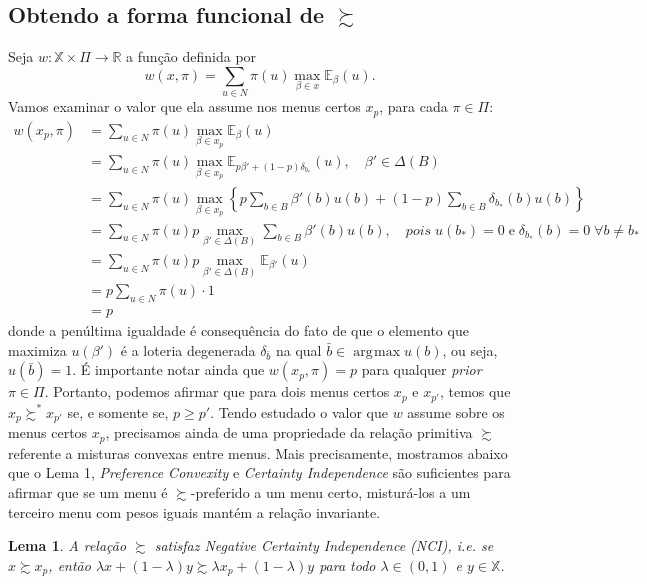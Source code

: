 \documentclass[11pt, a4paper]{article}
\theoremstyle{nonumberplain}
\theoremstyle{plain}
\theoremstyle{plain}
\theoremstyle{plain}
\newtheorem{lemma}{Lema}
\theoremstyle{nonumberplain}
\DeclareMathOperator*{\argmax}{\arg\!\max}
\begin{document}
\subsection{Obtendo a forma funcional de $\succsim$}
Seja $w:\mathbb{X}\times \Pi\rightarrow \mathbb{R}$ a função definida por $$w(x,\pi)=\sum_{u\in N} \pi(u)\max_{\beta\in x}\mathbb{E}_\beta(u).$$ Vamos examinar o valor que ela assume nos menus certos $x_p$, para cada $\pi\in\Pi$:
\begin{align*}
w(x_p,\pi)&=\sum_{u\in N} \pi(u)\max_{\beta\in x_{p}}\mathbb{E}_\beta(u)\\
&= \sum_{u\in N} \pi(u)\max_{\beta\in x_{p}}\mathbb{E}_{p\beta'+(1-p)\delta_{b_*}}(u),\quad \beta'\in \Delta(B)\\
&=\sum_{u\in N} \pi(u)\max_{\beta\in x_{p}}\left\lbrace p \sum_{b\in B}\beta'(b)u(b)+(1-p)\sum_{b\in B}\delta_{b_*}(b)u(b)\right\rbrace \\
&=\sum_{u\in N} \pi(u)p\max_{\beta'\in \Delta(B)}\sum_{b\in B}\beta'(b)u(b), \quad pois \; u(b_*)=0\; \text{e}\; \delta_{b_*}(b)=0\; \forall b\neq b_*\\
&= \sum_{u\in N} \pi(u) p \max_{\beta'\in \Delta(B)} \mathbb{E}_{\beta'}(u)\\
&= p\sum_{u\in N}\pi(u)\cdot 1\\
&=p
\end{align*}
donde a penúltima igualdade é consequência do fato de que o elemento que maximiza $u(\beta')$ é a loteria degenerada $\delta_{\bar{b}}$ na qual $\bar{b}\in\argmax u(b)$, ou seja, $u(\bar{b})=1$. É importante notar ainda que $w(x_p,\pi)=p$ para qualquer \textit{prior} $\pi\in\Pi$. Portanto, podemos afirmar que para dois menus certos $x_p$ e $x_{p'}$, temos que $x_p\succsim^* x_{p'}$ se, e somente se, $p\geq p'$.
Tendo estudado o valor que $w$ assume sobre os menus certos $x_p$, precisamos ainda de uma propriedade da relação primitiva $\succsim$ referente a misturas convexas entre menus. Mais precisamente, mostramos abaixo que o Lema 1, \emph{Preference Convexity} e \emph{Certainty Independence} são suficientes para afirmar que se um menu é $\succsim$-preferido a um menu certo, misturá-los a um terceiro menu com pesos iguais mantém a relação invariante.
\begin{lemma}\label{NCI}A relação $\succsim$ satisfaz \emph{Negative Certainty Independence (NCI)}, i.e. se $x\succsim x_p$, então $\lambda x +(1-\lambda)y\succsim \lambda x_p +(1-\lambda)y$ para todo $\lambda\in(0,1)$ e $y\in \mathbb{X}$.\end{lemma}
\end{document}
